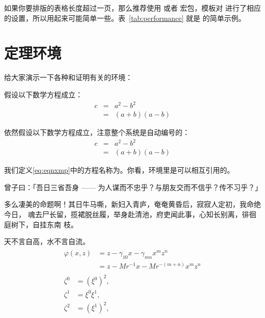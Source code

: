 如果你要排版的表格长度超过一页，那么推荐使用  或者 宏包，模板对  进行了相应的设置，所以用起来可能简单一些。表~\ref{tab:performance} 就是  的简单示例。

\section{定理环境}
\label{sec:theorem}

给大家演示一下各种和证明有关的环境：

\begin{assumption}
	假设以下数学方程成立：
	\begin{eqnarray}
	\label{eq:eqnxmp}
	c & = & a^2 - b^2\\
	& = & (a+b)(a-b)
	\end{eqnarray}
\end{assumption}

\begin{assumption}
	依然假设以下数学方程成立，注意整个系统是自动编号的：
	\begin{eqnarray}
	\label{eq:eqnxmp2}
	c & = & a^2 - b^2\\
	& = & (a+b)(a-b)
	\end{eqnarray}
\end{assumption}

\begin{definition}
	我们定义\ref{eq:eqnxmp}中的方程名称为\cquthesis 。你看，环境里是可以相互引用的。
\end{definition}

\begin{proposition}
	曾子曰：「吾日三省吾身 —— 为人谋而不忠乎？与朋友交而不信乎？传不习乎？」
\end{proposition}

多么凄美的命题啊！其日牛马嘶，新妇入青庐，奄奄黄昏后，寂寂人定初，我命绝今日，
魂去尸长留，揽裙脱丝履，举身赴清池，府吏闻此事，心知长别离，徘徊庭树下，自挂东南
枝。

\begin{remark}
	天不言自高，水不言自流。
	\begin{gather*}
	\begin{split} 
	\varphi(x,z)
	&=z-\gamma_{10}x-\gamma_{mn}x^mz^n\\
	&=z-Mr^{-1}x-Mr^{-(m+n)}x^mz^n
	\end{split}\\[6pt]
	\begin{align} \zeta^0&=(\xi^0)^2,\\
	\zeta^1 &=\xi^0\xi^1,\\
	\zeta^2 &=(\xi^1)^2,
	\end{align}
	\end{gather*}
\end{remark}

